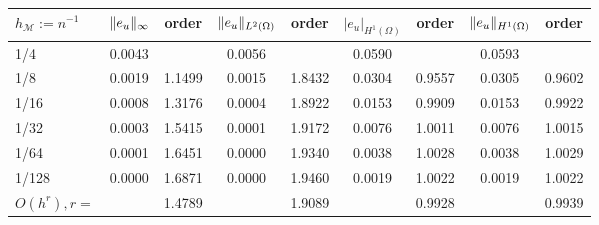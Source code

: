\begin{tabular}{lcccccccc}
    \hline
    $h_\mathcal{M}:=n^{-1}$ & $\lVert e_u\rVert_\infty$ & order & 
    $\lVert e_u\rVert_{L^2(\Omega)}$ & order & $|e_u|_{H^1(\Omega)}$ & order &
    $\lVert e_u\rVert_{H^1(\Omega)}$ & order \Tstrut\Bstrut \\
    \hline
      1/4    &0.0043    &          &0.0056    &          &0.0590    &          &0.0593    &      \Tstrut\\
      1/8    &0.0019    &1.1499    &0.0015    &1.8432    &0.0304    &0.9557    &0.0305    &0.9602\\
     1/16    &0.0008    &1.3176    &0.0004    &1.8922    &0.0153    &0.9909    &0.0153    &0.9922\\
     1/32    &0.0003    &1.5415    &0.0001    &1.9172    &0.0076    &1.0011    &0.0076    &1.0015\\
     1/64    &0.0001    &1.6451    &0.0000    &1.9340    &0.0038    &1.0028    &0.0038    &1.0029\\
    1/128    &0.0000    &1.6871    &0.0000    &1.9460    &0.0019    &1.0022    &0.0019    &1.0022\Bstrut\\ \hline\Tstrut
$O(h^r),r=$  &          &1.4789    &          &1.9089    &          &0.9928    &          &0.9939\Bstrut\\ 
    \hline
\end{tabular}
